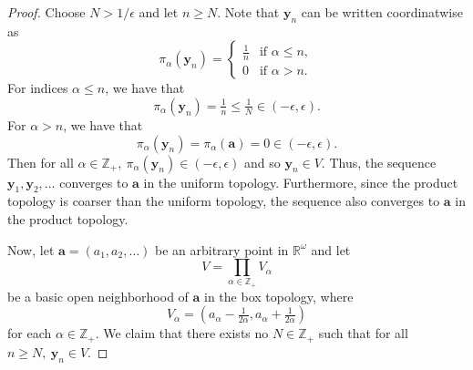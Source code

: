 \documentclass[a4paper,10pt]{article}
\newcommand{\by}{\mathbf{y}}
\newcommand{\ZZ}{\mathbb{Z}}
\newcommand{\RR}{\mathbb{R}}
\begin{document}
\begin{solution}
\begin{proof}
        Choose $N > 1/\epsilon$ and let $n \geq N$.
        Note that $\by_n$ can be written coordinatwise as
        \begin{equation*}
            \pi_\alpha(\by_n) = \begin{cases}
                \tfrac{1}{n}    & \text{if } \alpha \leq n, \\
                0               & \text{if } \alpha > n.
            \end{cases}
        \end{equation*}
        For indices $\alpha \leq n$, we have that
        \begin{equation*}
            \pi_\alpha(\by_n) = \tfrac{1}{n} \leq \tfrac{1}{N} \in (-\epsilon, \epsilon).
        \end{equation*}
        For $\alpha > n$, we have that
        \begin{equation*}
            \pi_\alpha(\by_n) = \pi_\alpha(\mathbf{a}) = 0 \in (-\epsilon, \epsilon).
        \end{equation*}
        Then for all $\alpha \in \ZZ_+,~ \pi_\alpha(\by_n) \in (-\epsilon, \epsilon)$ and so $\by_n \in V$.
        Thus, the sequence $\by_1, \by_2, \ldots$ converges to $\mathbf{a}$ in the uniform topology.
        Furthermore, since the product topology is coarser than the uniform topology, the sequence also converges to $\mathbf{a}$ in the product topology.

        Now, let $\mathbf{a} = (a_1, a_2, \ldots)$ be an arbitrary point in $\RR^\omega$ and let
        \begin{equation*}
            V = \prod_{\alpha\in\ZZ_+} V_\alpha
        \end{equation*}
        be a basic open neighborhood of $\mathbf{a}$ in the box topology, where 
        \begin{equation*}
            V_\alpha = (a_\alpha - \tfrac{1}{2\alpha}, a_\alpha + \tfrac{1}{2\alpha})
        \end{equation*}
        for each $\alpha \in \ZZ_+$.
        We claim that there exists no $N \in \ZZ_+$ such that for all $n \geq N,~ \by_n \in V$.


\end{proof}
\end{solution}
\end{document}
